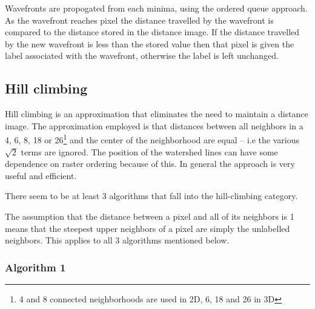 \documentclass{InsightArticle}
\begin{document}
Wavefronts are propogated from each minima, using the ordered queue
approach. As the wavefront reaches pixel the distance travelled by the
wavefront is compared to the distance stored in the distance image. If
the distance travelled by the new wavefront is less than the stored
value then that pixel is given the label associated with the
wavefront, otherwise the label is left unchanged.

\subsection{Hill climbing}
Hill climbing is an approximation that eliminates the need to maintain
a distance image. The approximation employed is that distances between
all neighbors in a 4, 6, 8, 18 or 26\footnote{4 and 8 connected
neighborhoods are used in 2D, 6, 18 and 26 in 3D} and the center of
the neighborhood are equal -- i.e the various $\sqrt{2}$ terms are
ignored. The position of the watershed lines can have some dependence
on raster ordering because of this. In general the approach is very
useful and efficient.

There seem to be at least 3 algorithms that fall into the
hill-climbing category.


The assumption that the distance between a pixel and all of its
neighbors is 1 means that the steepest upper neighbors of a pixel are
simply the unlabelled neighbors. This applies to all 3 algorithms
mentioned below.

\subsubsection{Algorithm 1}
\end{document}
